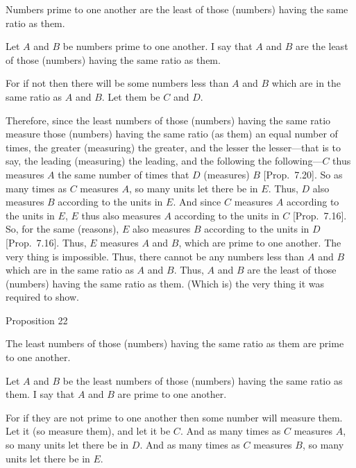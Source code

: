 Numbers prime to one another are the least of
those (numbers) having the same ratio as them.

Let $A$ and $B$ be numbers prime to one another. I say that $A$ and $B$
are the least of those (numbers) having the same ratio as them.

For if not then there will be some numbers less than $A$ and $B$ which are in
the same ratio as $A$ and $B$. Let them be $C$ and $D$.

\epsfysize=1.8in
\centerline{}

Therefore, since the least numbers of those (numbers) having the
same ratio measure those (numbers) having the same ratio (as them)
an equal number of times, the greater (measuring) the greater, and
the lesser  the lesser---that is to say, the leading (measuring) the leading, and
the following the following---$C$ thus measures $A$ the same number of
times that $D$ (measures) $B$  [Prop.~7.20].
So as many times as $C$ measures $A$, so many units let there be in $E$.
Thus, $D$ also measures $B$ according to the units in $E$. And since $C$ measures
$A$ according to the units in $E$, $E$ thus also measures $A$ according to the
units in $C$ [Prop.~7.16]. So, for the
same (reasons), $E$ also measures $B$ according to the units in $D$  [Prop.~7.16]. Thus, $E$ measures $A$ and $B$, which
are prime to one another. The very thing is impossible. Thus, there cannot
be any numbers less than $A$ and $B$ which are in the same ratio as $A$ and
$B$. Thus, $A$ and $B$ are the least of those (numbers) having the same ratio
as them. (Which is) the very thing it was required to show.


\begin{center}
{\large Proposition 22}
\end{center}

The  least numbers of those (numbers) having
the same ratio as them are prime to one another.

\epsfysize=1.6in
\centerline{}

Let $A$ and $B$ be the least numbers of those (numbers) having the same
ratio as them. I say that $A$ and $B$ are prime to one another.

For if they are not prime to one another then some number will measure them.
Let it (so measure them), and let it be $C$. And as many times as $C$ measures
$A$, so many units let there be in $D$. And as many times as $C$ measures $B$,
so many units let there be in $E$.


